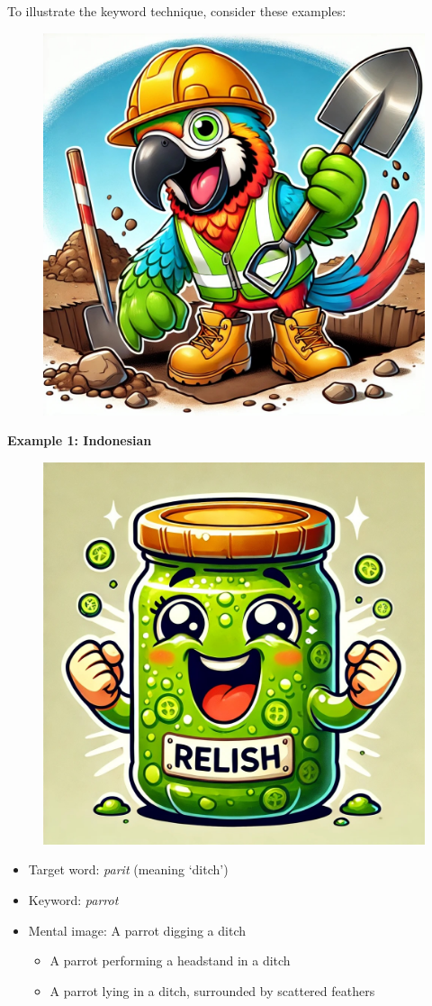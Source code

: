 \begin{tcolorbox}[title=Keyword Technique Examples, colback=white, colframe=blue!75!black, fonttitle=\bfseries]

To illustrate the keyword technique, consider these examples:

\begin{figure}
\includegraphics[width=0.5\linewidth]{figures/parrot.jpg}
\end{figure}

\textbf{Example 1: Indonesian}


\begin{figure}
\includegraphics[width=0.5\linewidth]{figures/relish.jpg}
\end{figure}

\begin{itemize}
    \item Target word: \textit{parit} (meaning `ditch')
    \item Keyword: \textit{parrot}
    \item Mental image: A parrot digging a ditch
    \begin{itemize}
        \item A parrot performing a headstand in a ditch
        \item A parrot lying in a ditch, surrounded by scattered feathers 
    \end{itemize}
\end{itemize}




\end{tcolorbox}
